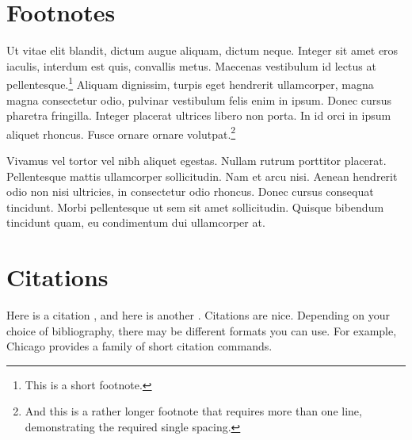 \section{Footnotes}

Ut vitae elit blandit, dictum augue aliquam, dictum neque. Integer sit amet eros
iaculis, interdum est quis, convallis metus. Maecenas vestibulum id lectus at
pellentesque.\footnote{This is a short footnote.} Aliquam dignissim, turpis eget
hendrerit ullamcorper, magna magna consectetur odio, pulvinar vestibulum felis
enim in ipsum. Donec cursus pharetra fringilla. Integer placerat ultrices libero
non porta. In id orci in ipsum aliquet rhoncus. Fusce ornare ornare
volutpat.\footnote{And this is a rather longer footnote that requires more than
one line, demonstrating the required single spacing.}

Vivamus vel tortor vel nibh aliquet egestas. Nullam rutrum porttitor placerat.
Pellentesque mattis ullamcorper sollicitudin. Nam et arcu nisi. Aenean hendrerit
odio non nisi ultricies, in consectetur odio rhoncus. Donec cursus consequat
tincidunt. Morbi pellentesque ut sem sit amet sollicitudin. Quisque bibendum
tincidunt quam, eu condimentum dui ullamcorper at.

\section{Citations}

Here is a citation \cite{fake1}, and here is another \cite{fake2}. Citations are
nice. Depending on your choice of bibliography, there may be different formats
you can use. For example, Chicago provides a family of short citation commands.
